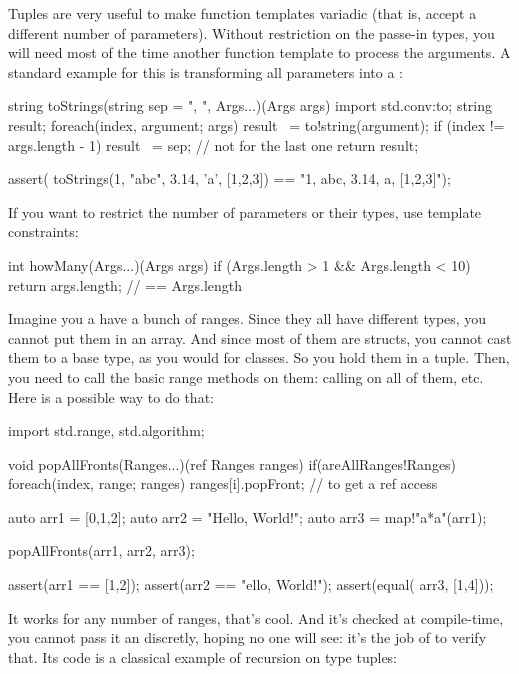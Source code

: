 Tuples are very useful to make function templates variadic (that is, accept a different number of parameters). Without restriction on the passe-in types, you will need most of the time another function template to process the arguments. A standard example for this is transforming all parameters into a :

\begin{dcode}
string toStrings(string sep = ", ", Args...)(Args args)
{
    import std.conv:to;
    string result;
    foreach(index, argument; args)
    {
        result ~= to!string(argument);
        if (index != args.length - 1) result ~= sep; // not for the last one
    }
    return result;
}

assert( toStrings(1, "abc", 3.14, 'a', [1,2,3]) == "1, abc, 3.14, a, [1,2,3]"); 
\end{dcode}

If you want to restrict the number of parameters or their types, use template constraints:

\begin{dcode}
int howMany(Args...)(Args args) if (Args.length > 1 && Args.length < 10)
{
    return args.length; // == Args.length
}
\end{dcode}

Imagine you a have a bunch of ranges. Since they all have different types, you cannot put them in an array. And since most of them are structs, you cannot cast them to a base type, as you would for classes. So you hold them in a tuple. Then, you need to call the basic range methods on them: calling  on all of them, etc. Here is a possible way to do that:

\begin{dcode}
import std.range, std.algorithm;

void popAllFronts(Ranges...)(ref Ranges ranges) 
    if(areAllRanges!Ranges)
{
    foreach(index, range; ranges) 
        ranges[i].popFront; // to get a ref access
}

auto arr1 = [0,1,2];
auto arr2 = "Hello, World!";
auto arr3 = map!"a*a"(arr1);

popAllFronts(arr1, arr2, arr3);

assert(arr1 == [1,2]);
assert(arr2 == "ello, World!");
assert(equal( arr3, [1,4])); 
\end{dcode}

It works for any number of ranges, that's cool. And it's checked at compile-time, you cannot pass it an  discretly, hoping no one will see: it's the job of  to verify that. Its code is a classical example of recursion on type tuples:

